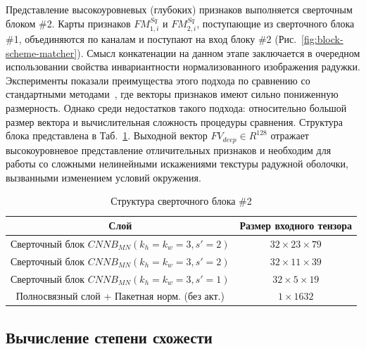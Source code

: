 Представление высокоуровневых (глубоких) признаков выполняется сверточным блоком \#2. Карты признаков $FM^{Sq}_{1,i}$ и $FM^{Sq}_{2,i}$, поступающие из сверточного блока \#1, объединяются по каналам и поступают на вход блоку \#2 (Рис.~\ref{fig:block-scheme-matcher}). Смысл конкатенации на данном этапе  заключается в очередном использовании свойства инвариантности нормализованного изображения радужки. Эксперименты показали преимущества этого подхода по сравнению со стандартными методами~\cite{koch_2015}, где векторы признаков имеют сильно пониженную размерность. Однако среди недостатков такого подхода: относительно большой размер вектора и вычислительная сложность процедуры сравнения. Структура блока представлена в Таб.~\ref{tab:conv-block-2}. Выходной вектор $FV_{deep}\in R^{128} $ отражает высокоуровневое представление отличительных признаков и необходим для работы со сложными нелинейными искажениями текстуры радужной оболочки, вызванными изменением условий окружения.

\begin{table}
	\begin{center}
		\begin{tabular}{|c|c|}
			\hline
			\textbf{Слой}										& \textbf{Размер входного тензора} \\
			\hline
			Сверточный блок $CNNB_{MN} (k_h=k_w=3,s'=2)$ 	& $32\times23\times79$\\
			Сверточный блок $CNNB_{MN} (k_h=k_w=3,s'=2)$ 	& $32\times11\times39$\\
			Сверточный блок $CNNB_{MN} (k_h=k_w=3,s'=1)$ 	& $32\times5\times19$\\
			Полносвязный слой + Пакетная норм. (без акт.)	& $1\times1632$\\
			\hline
		\end{tabular}
		\caption{Структура сверточного блока \#2}
		\label{tab:conv-block-2}
	\end{center}
\end{table}

\subsection{Вычисление степени схожести}


